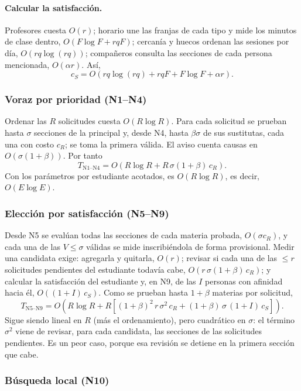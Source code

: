 \paragraph{Calcular la satisfacción.} Profesores cuesta $O(r)$; horario une las franjas de cada tipo y mide los minutos de clase dentro, $O(F \log F + rqF)$; cercanía y huecos ordenan las sesiones por día, $O(rq \log(rq))$; compañeros consulta las secciones de cada persona mencionada, $O(\alpha r)$. Así,
\[
c_S = O\!\left(rq \log(rq) + rqF + F \log F + \alpha r\right).
\]

\subsubsection{Voraz por prioridad (N1--N4)}

Ordenar las $R$ solicitudes cuesta $O(R \log R)$. Para cada solicitud se prueban hasta $\sigma$ secciones de la principal y, desde N4, hasta $\beta\sigma$ de sus sustitutas, cada una con costo $c_R$; se toma la primera válida. El aviso cuenta causas en $O(\sigma(1+\beta))$. Por tanto
\[
T_{\mathrm{N1\text{--}N4}} = O\!\left(R \log R + R\,\sigma(1+\beta)\,c_R\right).
\]
Con los parámetros por estudiante acotados, es $O(R \log R)$, es decir, $O(E \log E)$.

\subsubsection{Elección por satisfacción (N5--N9)}

Desde N5 se evalúan todas las secciones de cada materia probada, $O(\sigma c_R)$, y cada una de las $V \le \sigma$ válidas se mide inscribiéndola de forma provisional. Medir una candidata exige: agregarla y quitarla, $O(r)$; revisar si cada una de las $\le r$ solicitudes pendientes del estudiante todavía cabe, $O(r\,\sigma(1+\beta)\,c_R)$; y calcular la satisfacción del estudiante y, en N9, de las $I$ personas con afinidad hacia él, $O((1+I)\,c_S)$. Como se prueban hasta $1+\beta$ materias por solicitud,
\[
T_{\mathrm{N5\text{--}N9}} = O\!\left(R \log R + R\left[(1+\beta)^2\, r\, \sigma^2\, c_R + (1+\beta)\,\sigma\,(1+I)\,c_S\right]\right).
\]
Sigue siendo lineal en $R$ (más el ordenamiento), pero cuadrático en $\sigma$: el término $\sigma^2$ viene de revisar, para cada candidata, las secciones de las solicitudes pendientes. Es un peor caso, porque esa revisión se detiene en la primera sección que cabe.

\subsubsection{Búsqueda local (N10)}

